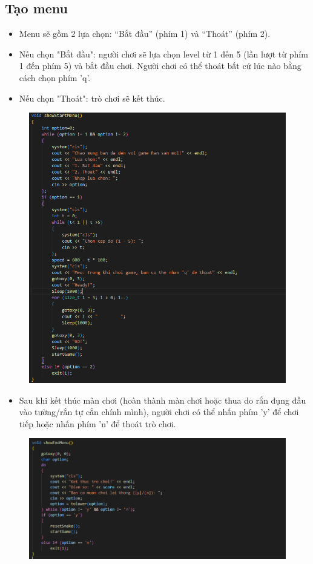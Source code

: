 \documentclass[../main-report.tex]{subfiles}
\begin{document}
\subsection{Tạo menu}
\begin{itemize}
    \item Menu sẽ gồm 2 lựa chọn: “Bắt đầu” (phím 1) và “Thoát” (phím 2).
    \item Nếu chọn "Bắt đầu": người chơi sẽ lựa chọn level từ 1 đến 5 (lần lượt từ phím 1 đến phím 5) và bắt đầu chơi. Người chơi có thể thoát bất cứ lúc nào bằng cách chọn phím ’q’.
    \item Nếu chọn "Thoát": trò chơi sẽ kết thúc.
\end{itemize}
\begin{figure}[ht]
    \centering
    \includegraphics[scale=0.6]{chapters/hinh/snake4.png}
\end{figure}
\begin{itemize}
    \item Sau khi kết thúc màn chơi (hoàn thành màn chơi hoặc thua do rắn đụng đầu vào tường/rắn tự cắn chính mình), người chơi có thể nhấn phím ’y’ để chơi tiếp hoặc nhấn phím ’n’ để thoát trò chơi.
\end{itemize}
\begin{figure}[ht]
    \centering
    \includegraphics[scale=0.5]{chapters/hinh/snake5.png}
\end{figure}
\end{document}
